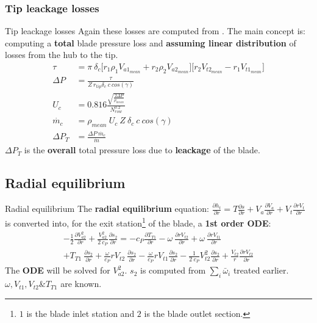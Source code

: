 \subsubsection{Tip leackage losses}
	{\nologo
	\begin{frame}{Tip leackage losses}
		Again these losses are computed from \cite[Sec. 6.9]{axial2004}. The main concept is: computing a \textbf{total} blade pressure loss and \textbf{assuming linear distribution} of losses from the hub to the tip. 
		\begin{align}
			\tau & = \pi \ \delta_c \Big[ r_1 \rho_1 V_{a1_{mean}} + r_2 \rho_2 V_{a2_{mean}} \Big] \Big[ r_2 V_{t2_{mean}} - r_1 V_{t1_{mean}} \Big] \nonumber \\ 
			\Delta P & = \frac{\tau}{Z \ r_{tip} \delta_c \ c \ cos(\gamma)} \nonumber \\ 
			U_c & = 0.816 \frac{\sqrt{\frac{2 \Delta P}{\rho_{mean}}}}{N_{row}^{0.2}} \nonumber \\ 
			\dot{m_c} & = \rho_{mean} \ U_c \ Z \ \delta_c \ c \ cos(\gamma) \nonumber \\ 
			\Delta P_T & = \frac{\Delta P \ \dot{m_c}}{\dot{m}} \nonumber  
		\end{align}
		$\Delta P_T$ is the \textbf{overall} total pressure loss due to \textbf{leackage} of the blade.
	\end{frame}
	}

\subsection{Radial equilibrium}
	\begin{frame}{Radial equilibrium}
		The \textbf{radial equilibrium} equation: $\frac{\partial h_t}{\partial r} = T \frac{\partial s}{\partial r} + V_a \frac{\partial V_a}{\partial r} + V_t \frac{\partial r V_t}{\partial r}$ is converted into, for the exit station\footnote{$1$ is the blade inlet station and $2$ is the blade outlet section.} of the blade, a \textbf{1st order ODE}:
		\begin{equation}
			\begin{split}
				- \frac{1}{2} \frac{\partial V_{a2}^2}{\partial r} + \frac{V_{a2}^2}{2 \ c_P} \frac{\partial s_{2}}{\partial r} = - c_P \frac{\partial T_{T1}}{\partial r} - \omega \ \frac{\partial r V_{t2}}{\partial r} + \omega \ \frac{\partial r V_{t1}}{\partial r} \\ + T_{T1} \ \frac{\partial s_2}{\partial r} + \frac{\omega}{c_P} r V_{t2} \ \frac{\partial s_2}{\partial r} - \frac{\omega}{c_P} r V_{t1} \frac{\partial s_2}{\partial r} - \frac{1}{2 \ c_P} V_{t2}^2 \frac{\partial s_2}{\partial r} + \frac{V_{t2}}{r} \frac{\partial r V_{t2}}{\partial r}	
			\nonumber
			\end{split}
		\end{equation}
		The \textbf{ODE} will be solved for $V_{a2}^2$.
		\newline
		$s_2$ is computed from $\sum_i \bar{\omega}_{i}$ treated earlier. 
		\newline 
		$\omega, V_{t1}, V_{t2} \& T_{T1}$ are known.
	\end{frame}
	
